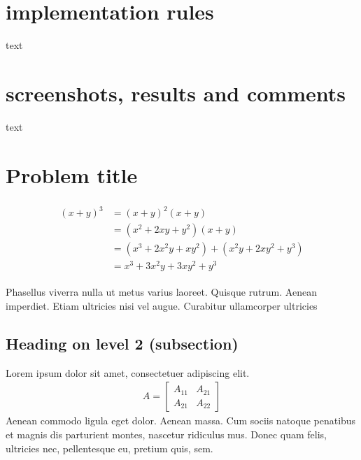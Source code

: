 \documentclass[paper=a4, fontsize=11pt]{scrartcl} %
\numberwithin{equation}{section} %
\numberwithin{figure}{section} %
\numberwithin{table}{section} %
\begin{document}
\section{implementation rules}
text

\section{screenshots, results and comments}
text


\section{Problem title}

\lipsum[2] %

\begin{align} 
\begin{split}
(x+y)^3 	&= (x+y)^2(x+y)\\
&=(x^2+2xy+y^2)(x+y)\\
&=(x^3+2x^2y+xy^2) + (x^2y+2xy^2+y^3)\\
&=x^3+3x^2y+3xy^2+y^3
\end{split}					
\end{align}

Phasellus viverra nulla ut metus varius laoreet. Quisque rutrum. Aenean imperdiet. Etiam ultricies nisi vel augue. Curabitur ullamcorper ultricies


\subsection{Heading on level 2 (subsection)}

Lorem ipsum dolor sit amet, consectetuer adipiscing elit. 
\begin{align}
A = 
\begin{bmatrix}
A_{11} & A_{21} \\
A_{21} & A_{22}
\end{bmatrix}
\end{align}
Aenean commodo ligula eget dolor. Aenean massa. Cum sociis natoque penatibus et magnis dis parturient montes, nascetur ridiculus mus. Donec quam felis, ultricies nec, pellentesque eu, pretium quis, sem.
\end{document}
